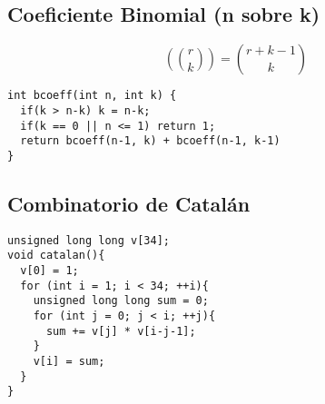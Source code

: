 \documentclass[10pt, a4, oneside]{article}
\begin{document}
\subsection{Coeficiente Binomial (n sobre k)}
\[ \left( {r \choose k} \right) = {r+k-1 \choose k} \]
\begin{verbatim}
int bcoeff(int n, int k) {
  if(k > n-k) k = n-k;
  if(k == 0 || n <= 1) return 1;
  return bcoeff(n-1, k) + bcoeff(n-1, k-1)
}
\end{verbatim}

\subsection{Combinatorio de Catalán}
\begin{verbatim}
unsigned long long v[34];
void catalan(){
  v[0] = 1;
  for (int i = 1; i < 34; ++i){
    unsigned long long sum = 0;
    for (int j = 0; j < i; ++j){
      sum += v[j] * v[i-j-1];
    }
    v[i] = sum;
  }
}
\end{verbatim}
\end{document}
